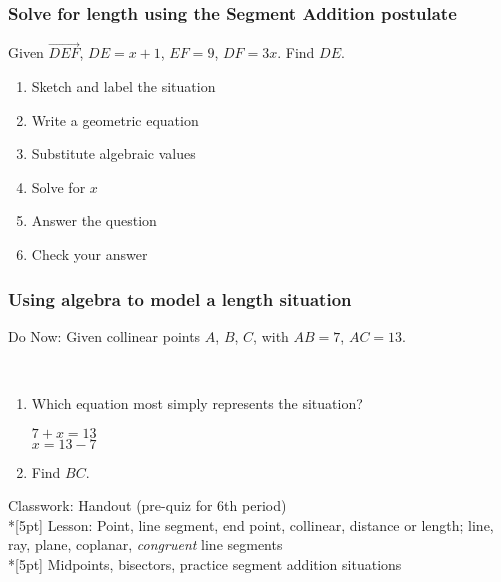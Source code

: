 \documentclass{beamer}
\begin{document}
\frame
{
  \frametitle{Solve for length using the Segment Addition postulate}
  
  Given $\overrightarrow{DEF}$, $DE=x+1$, $EF=9$, $DF=3x$. Find ${DE}$.\\[0.5in]
  \begin{center}   
  \end{center}
\begin{enumerate}
    \item<2-> Sketch and label the situation\\
    \item<2-> Write a geometric equation\\
    \item<2-> Substitute algebraic values\\
    \item<2-> Solve for $x$\\
    \item<2-> Answer the question\\
    \item<2-> Check your answer
  \end{enumerate}
}

\frame
{
  \frametitle{Using algebra to model a length situation}

  Do Now: Given collinear points $A$, $B$, $C$, with $AB=7$, $AC=13$.
       \\ \vspace{0.2cm}
    \begin{enumerate}
      \item Which equation most simply represents the situation?
      \begin{multicols}{2}
        $7 + x = 13$ \\
        $x = 13 - 7$
      \end{multicols}
    \item Find $BC$.
    \end{enumerate}
    Classwork: Handout (pre-quiz for 6th period) \\*[5pt]
  Lesson: Point, line segment, end point, collinear, distance or length; line, ray, plane, coplanar, \emph{congruent} line segments \\*[5pt]
  Midpoints, bisectors, practice segment addition situations
  }
\end{document}
